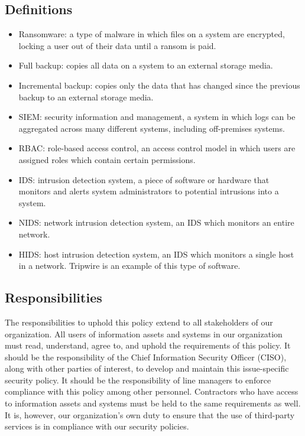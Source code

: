 \documentclass[11pt]{article}
\begin{document}
\subsection{Definitions}
\label{sec:org30b9a82}
\begin{itemize}
\item Ransomware: a type of malware in which files on a system are encrypted, locking a user out of their data until a ransom is paid.
\item Full backup: copies all data on a system to an external storage media.
\item Incremental backup: copies only the data that has changed since the previous backup to an external storage media.
\item SIEM: security information and management, a system in which logs can be aggregated across many different systems, including off-premises systems.
\item RBAC: role-based access control, an access control model in which users are assigned roles which contain certain permissions.
\item IDS: intrusion detection system, a piece of software or hardware that monitors and alerts system administrators to potential intrusions into a system.
\item NIDS: network intrusion detection system, an IDS which monitors an entire network.
\item HIDS: host intrusion detection system, an IDS which monitors a single host in a network. Tripwire is an example of this type of software.
\end{itemize}

\subsection{Responsibilities}
\label{sec:org9e552ce}
The responsibilities to uphold this policy extend to all stakeholders of our organization. All users of information assets and systems in our organization must read, understand, agree to, and uphold the requirements of this policy. It should be the responsibility of the Chief Information Security Officer (CISO), along with other parties of interest, to develop and maintain this issue-specific security policy. It should be the responsibility of line managers to enforce compliance with this policy among other personnel. Contractors who have access to information assets and systems must be held to the same requirements as well. It is, however, our organization's own duty to ensure that the use of third-party services is in compliance with our security policies.
\end{document}
